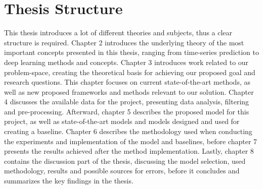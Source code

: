 
\section{Thesis Structure}
\label{sections:Introduction:Structure}

This thesis introduces a lot of different theories and subjects,
thus a clear structure is required.
Chapter 2 introduces the underlying theory of the most important concepts presented in this thesis,
ranging from time-series prediction to deep learning methods and concepts.
Chapter 3 introduces work related to our problem-space, creating the theoretical basis for achieving our proposed goal and research questions.
This chapter focuses on current state-of-the-art methods,
as well as new proposed frameworks and methods relevant to our solution.
Chapter 4 discusses the available data for the project, presenting data analysis, filtering and pre-processing.
Afterward, chapter 5 describes the proposed model for this project, as well as state-of-the-art models and models designed and used for creating a baseline.
Chapter 6 describes the methodology used when conducting the experiments and implementation of the model and baselines,
before chapter 7 presents the results achieved after the method implementation.
Lastly, chapter 8 contains the discussion part of the thesis, discussing the model selection, used methodology, results and possible sources for errors,
before it concludes and summarizes the key findings in the thesis.



\iffalse
This thesis introduces a lot of different theories and subjects,
thus a clear structure is required.
Chapter 2 introduces the underlying theory of the most important concepts presented in this thesis,
ranging from time-series prediction to deep learning methods and concepts.
Chapter 3 introduces work related to our problem-space, creating the theoretical basis for achieving our proposed goal and research questions.
This chapter focuses on current state-of-the-art methods,
as well as new proposed frameworks and methods relevant to our solution.
Chapter 4 introduces our proposed method and architecture,
presenting the model framework and model structure.
Lastly, chapter 5 supplies an evaluation and discussion of the proposed framework regarding our proposed research questions and goal.
\fi

